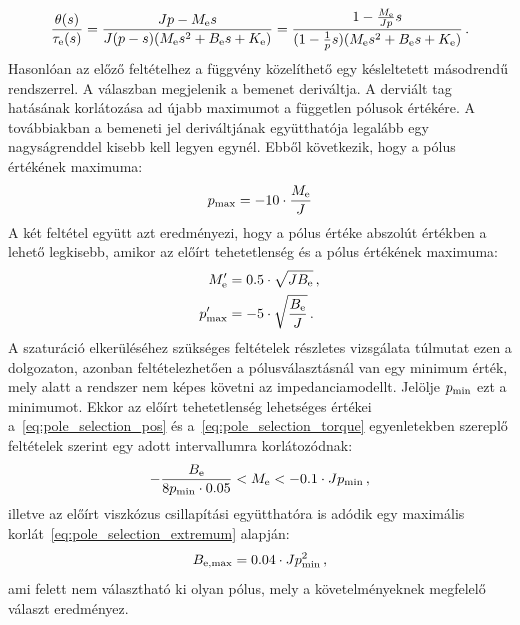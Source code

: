 \begin{align}
    \frac{\theta(s)}{\tau_{\mathrm{e}} (s)} = 
    \frac{Jp - M_{\mathrm{e}} s}{J(p-s)(M_{\mathrm{e}} s^2 + B_{\mathrm{e}} s + K_{\mathrm{e}})} = 
    \frac{1 -\frac{M_{\mathrm{e}}}{Jp} s}{(1-\frac{1}{p}s)(M_{\mathrm{e}} s^2 + B_{\mathrm{e}} s + K_{\mathrm{e}})}\,.
\end{align}
Hasonlóan az előző feltételhez a függvény közelíthető egy késleltetett másodrendű rendszerrel. A válaszban 
megjelenik a bemenet deriváltja. A derviált tag hatásának korlátozása ad újabb maximumot a független pólusok értékére. A 
továbbiakban a bemeneti jel deriváltjának együtthatója legalább egy nagyságrenddel kisebb kell legyen egynél.
Ebből következik, hogy a pólus értékének maximuma:
\begin{align}\label{eq:pole_selection_torque}
    p_{\mathrm{max}} = -10 \cdot \frac{M_{\mathrm{e}}}{J}
\end{align}
A két feltétel együtt azt eredményezi, hogy a pólus értéke abszolút értékben a lehető legkisebb, amikor
az előírt tehetetlenség és a pólus értékének maximuma:
\begin{equation}\label{eq:pole_selection_extremum}
    \begin{split}
        M'_{\mathrm{e}} &= 0.5 \cdot \sqrt{JB_{\mathrm{e}}}\,, \\
        p'_{\mathrm{max}} &= -5 \cdot \sqrt{\frac{B_{\mathrm{e}}}{J}}\,.
    \end{split}
\end{equation}
A szaturáció elkerüléséhez szükséges feltételek részletes vizsgálata túlmutat ezen a dolgozaton, azonban feltételezhetően 
a pólusválasztásnál van egy minimum érték, mely alatt a rendszer nem képes követni az impedanciamodellt. Jelölje \(p_{\mathrm{min}}\) ezt a 
minimumot. Ekkor az előírt tehetetlenség lehetséges értékei a~\eqref{eq:pole_selection_pos} és a~\eqref{eq:pole_selection_torque} 
egyenletekben szereplő feltételek szerint egy adott intervallumra korlátozódnak:
\begin{align}
    -\frac{B_{\mathrm{e}}}{8p_{\mathrm{min}} \cdot 0.05} < M_{\mathrm{e}} < -0.1 \cdot Jp_{\mathrm{min}}\,,
\end{align}
illetve az előírt viszkózus csillapítási együtthatóra is adódik egy maximális korlát~\eqref{eq:pole_selection_extremum} alapján:
\begin{align}
    B_{\mathrm{e,max}} = 0.04 \cdot Jp^2_{\mathrm{min}}\,,
\end{align}
ami felett nem választható ki olyan pólus, mely a követelményeknek megfelelő választ eredményez. 
